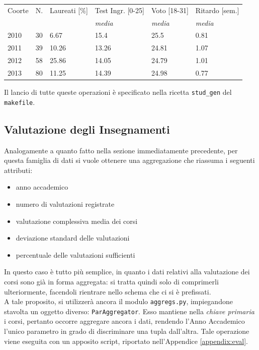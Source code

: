 		\noindent\begin{tabular}{llllll}
		\hline
		Coorte & N. & Laureati {[}\%{]} & Test Ingr. [0-25] & Voto [18-31] & Ritardo [sem.] \\
		 &  & & \textit{media} & \textit{media} & \textit{media}\\
		\hline
		2010 & 30 & 6.67 & 15.4 & 25.5 & 0.81 \\
		2011 & 39 & 10.26 & 13.26 & 24.81 & 1.07 \\
		2012 & 58 & 25.86 & 14.05 & 24.79 & 1.01 \\
		2013 & 80 & 11.25 & 14.39 & 24.98 & 0.77 \\ \hline
		\end{tabular}

		\vspace{0.4cm}

		Il lancio di tutte queste operazioni è specificato nella ricetta \texttt{stud\_gen} del \texttt{makefile}.

	\subsection{Valutazione degli Insegnamenti}
	\label{prepr:eval_min}

		Analogamente a quanto fatto nella sezione immediatamente precedente, per questa famiglia di dati si vuole ottenere una aggregazione che riassuma i seguenti attributi:

		\begin{itemize}
			\item anno accademico
			\item numero di valutazioni registrate
			\item valutazione complessiva media dei corsi
			\item deviazione standard delle valutazioni
			\item percentuale delle valutazioni sufficienti
		\end{itemize}

		In questo caso è tutto più semplice, in quanto i dati relativi alla valutazione dei corsi sono già in forma aggregata: si tratta quindi solo di comprimerli ulteriormente, facendoli rientrare nello schema che ci si è prefissati. \\
		
		A tale proposito, si utilizzerà ancora il modulo \texttt{aggregs.py}, impiegandone stavolta un oggetto diverso: \texttt{ParAggregator}. Esso mantiene nella \textit{chiave primaria} i corsi, pertanto occorre aggregare ancora i dati, rendendo l'Anno Accademico l'unico parametro in grado di discriminare una tupla dall'altra. Tale operazione viene eseguita con un apposito script, riportato nell'Appendice \ref{appendix:eval}. \\

